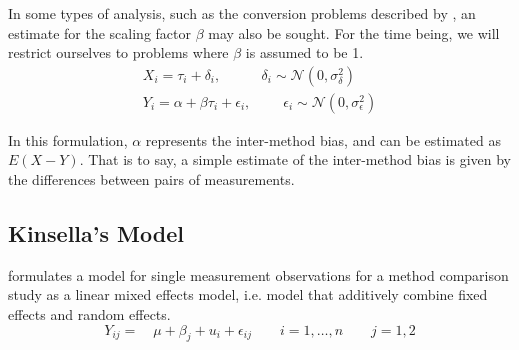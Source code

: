 \documentclass[12pt, a4paper]{report}
\theoremstyle{plain}
\theoremstyle{definition}
\theoremstyle{remark}
\begin{document}
%	
In some types of analysis, such as the conversion problems described by \citet{lewis}, an estimate for 
the scaling factor $\beta$ may also be sought. For the time being, we will restrict ourselves to problems where $\beta$ is assumed to be 1. 
\begin{eqnarray}
X_i = \tau_i + \delta_i, \phantom{spacin} \delta_i \sim \mathcal{N}(0,\sigma^2_\delta)\\
Y_i = \alpha + \beta \tau_i + \epsilon_i, \phantom{spaci}  \epsilon_i \sim \mathcal{N}(0,\sigma^2_\epsilon)
\end{eqnarray}

In this formulation, $\alpha$ represents the inter-method bias, and can be estimated as $E(X-Y)$. That is to say, a simple estimate of the inter-method bias is given by the differences between pairs of measurements.  








\subsection*{Kinsella's Model}
\citet{Kinsella} formulates a model for
single measurement observations for a method comparison study as a
linear mixed effects model, i.e. model that additively combine
fixed effects and random effects.
\[
Y_{ij} =\quad \mu + \beta_{j} + u_{i} + \epsilon_{ij} \qquad i = 1,\dots,n
\qquad j=1,2\]
\end{document}
